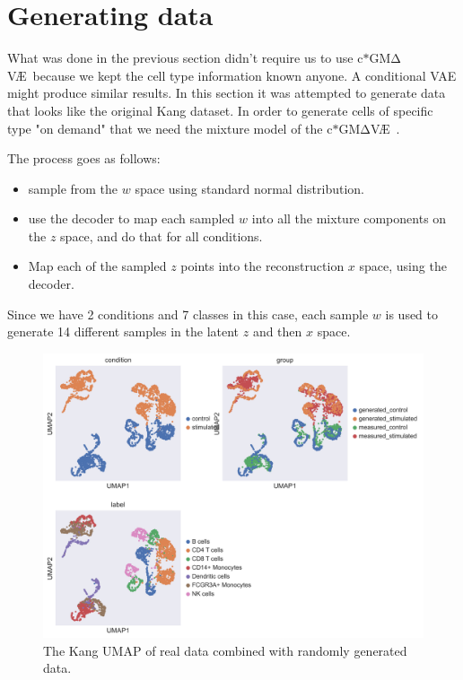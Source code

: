 \documentclass[11pt, a4paper]{report}
\theoremstyle{plain}
\theoremstyle{definition}
\theoremstyle{remark}
\newcommand{\gmvae}{c$\ast$GM$\mathrm{\Delta}$V\AE~}
\begin{document}
\section{Generating data}

What was done in the previous section didn't require us to use \gmvae because we
kept the cell type information known anyone. A conditional VAE might produce
similar results.
In this section it was attempted to generate data that looks like the original Kang dataset.
In order to generate cells of specific type "on demand" that we need the mixture model of the \gmvae.

The process goes as follows:
\begin{itemize}
\item{} sample from the $w$ space using standard normal distribution.
\item{} use the decoder to map each sampled $w$ into all the mixture components
on the $z$ space, and do that for all conditions.
\item{} Map each of the sampled $z$ points into the reconstruction $x$ space,
using the decoder.
\end{itemize}

Since we have 2 conditions and
7 classes in this case, each sample $w$ is used to generate 14 different samples
in the latent $z$ and then $x$ space.

\begin{figure}[h]
\centering
\includegraphics[width=1.1\textwidth]{images/Kang_generated_data.png}
\caption{
The Kang UMAP of real data combined with randomly generated data.
}
\label{fig:Kang_generated_data}
\end{figure}
\end{document}
